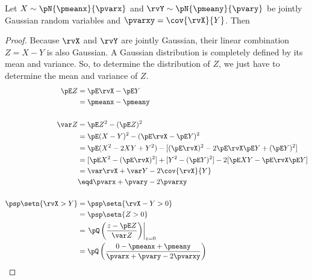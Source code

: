 \begin{proposition}
Let $X\sim\pN{\pmeanx}{\pvarx}$ and $\rvY\sim\pN{\pmeany}{\pvary}$ be
jointly Gaussian random variables and $\pvarxy=\cov{\rvX}{Y}$.
Then
\end{proposition}
\begin{proof}
Because $\rvX$ and $\rvY$ are jointly Gaussian,
their linear combination $Z=X-Y$ is also Gaussian.
A Gaussian distribution is completely defined by its mean and variance.
So, to determine the distribution of $Z$,
we just have to determine the mean and variance of $Z$.
\begin{align*}
  \pE Z
    &= \pE\rvX - \pE Y
  \\&= \pmeanx - \pmeany
\\
\\
  \var Z
    &= \pE Z^2 - (\pE Z)^2
  \\&= \pE (X-Y)^2 - (\pE\rvX - \pE Y)^2
  \\&= \pE (X^2-2XY+Y^2) - [(\pE\rvX)^2 -2\pE\rvX \pE Y + (\pE Y)^2 ]
  \\&= [\pE X^2- (\pE\rvX)^2]  + [Y^2- (\pE Y)^2] - 2[\pE XY - \pE\rvX \pE Y]
  \\&= \var\rvX + \var Y - 2\cov{\rvX}{Y}
  \\&\eqd \pvarx + \pvary -2\pvarxy
\\
\\
  \psp\setn{\rvX>Y}
    &= \psp\setn{\rvX-Y>0}
  \\&= \psp\setn{Z>0}
  \\&= \left.\pQ\left(\frac{z-\pE Z}{\var Z} \right)\right|_{z=0}
  \\&= \pQ\left(\frac{0-\pmeanx+\pmeany}{\pvarx+\pvary-2\pvarxy} \right)
\end{align*}
\end{proof}

